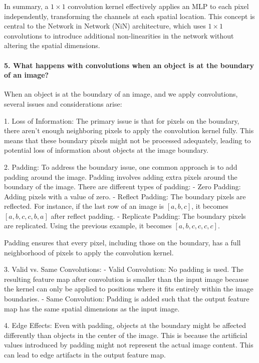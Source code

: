 In summary, a \( 1 \times 1 \) convolution kernel effectively applies an MLP to each pixel independently, transforming the channels at each spatial location.
This concept is central to the Network in Network (NiN) architecture, which uses \( 1 \times 1 \) convolutions to introduce additional non-linearities in the network without altering the spatial dimensions.

\paragraph{5. What happens with convolutions when an object is at the boundary of an image?}

When an object is at the boundary of an image, and we apply convolutions, several issues and considerations arise:

1. Loss of Information: The primary issue is that for pixels on the boundary, there aren't enough neighboring pixels to apply the convolution kernel fully. This means that these boundary pixels might not be processed adequately, leading to potential loss of information about objects at the image boundary.

2. Padding: To address the boundary issue, one common approach is to add padding around the image. Padding involves adding extra pixels around the boundary of the image. There are different types of padding:
- Zero Padding: Adding pixels with a value of zero.
- Reflect Padding: The boundary pixels are reflected. For instance, if the last row of an image is \([a, b, c]\), it becomes \([a, b, c, c, b, a]\) after reflect padding.
- Replicate Padding: The boundary pixels are replicated. Using the previous example, it becomes \([a, b, c, c, c, c]\).

Padding ensures that every pixel, including those on the boundary, has a full neighborhood of pixels to apply the convolution kernel.

3. Valid vs. Same Convolutions:
- Valid Convolution: No padding is used. The resulting feature map after convolution is smaller than the input image because the kernel can only be applied to positions where it fits entirely within the image boundaries.
- Same Convolution: Padding is added such that the output feature map has the same spatial dimensions as the input image.

4. Edge Effects: Even with padding, objects at the boundary might be affected differently than objects in the center of the image. This is because the artificial values introduced by padding might not represent the actual image content. This can lead to edge artifacts in the output feature map.


